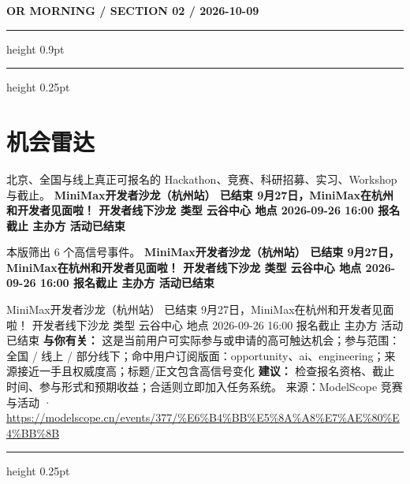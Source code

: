\documentclass[10.5pt]{ctexart}
\begin{document}
\newpage
{\small\bfseries OR MORNING / SECTION 02 / 2026-10-09}
\vspace{2mm}
\hrule height 0.9pt
\vspace{1.5mm}
\hrule height 0.25pt
\vspace{4mm}
\section*{机会雷达}
{\color{ormuted} 北京、全国与线上真正可报名的 Hackathon、竞赛、科研招募、实习、Workshop 与截止。}
\vspace{2mm}
{\LARGE\bfseries MiniMax开发者沙龙（杭州站） 已结束 9月27日，MiniMax在杭州和开发者见面啦！ 开发者线下沙龙 类型 云谷中心 地点 2026-09-26 16:00 报名截止 主办方 活动已结束}\par
\vspace{1mm}
{\color{ormuted} 本版筛出 6 个高信号事件。}
\vspace{3mm}
{\Large\bfseries MiniMax开发者沙龙（杭州站） 已结束 9月27日，MiniMax在杭州和开发者见面啦！ 开发者线下沙龙 类型 云谷中心 地点 2026-09-26 16:00 报名截止 主办方 活动已结束}\par
MiniMax开发者沙龙（杭州站） 已结束 9月27日，MiniMax在杭州和开发者见面啦！ 开发者线下沙龙 类型 云谷中心 地点 2026-09-26 16:00 报名截止 主办方 活动已结束
\textbf{与你有关：} 这是当前用户可实际参与或申请的高可触达机会；参与范围：全国 / 线上 / 部分线下；命中用户订阅版面：opportunity、ai、engineering；来源接近一手且权威度高；标题/正文包含高信号变化
\textbf{建议：} 检查报名资格、截止时间、参与形式和预期收益；合适则立即加入任务系统。
{\footnotesize\color{ormuted} 来源：ModelScope 竞赛与活动 · \url{https://modelscope.cn/events/377/%E6%B4%BB%E5%8A%A8%E7%AE%80%E4%BB%8B}}
\vspace{4mm}
\hrule height 0.25pt
\vspace{3mm}
\end{document}
